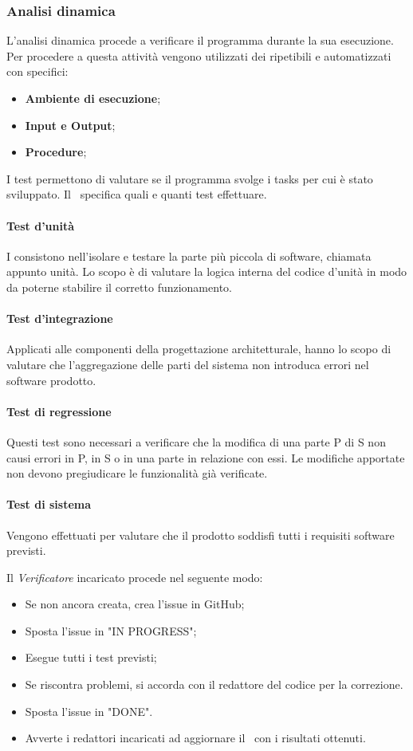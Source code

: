 \subsubsection{Analisi dinamica}
L'analisi dinamica procede a verificare il programma durante la sua esecuzione. Per procedere a questa attività vengono utilizzati dei  ripetibili e automatizzati con specifici:
\begin{itemize}
	\item \textbf{Ambiente di esecuzione};
	\item \textbf{Input e Output};
	\item \textbf{Procedure};
\end{itemize}

\label{Tests}
I test permettono di valutare se il programma svolge i tasks per cui è stato sviluppato. Il \PdQv{}\ specifica quali e quanti test effettuare.
\paragraph*{Test d'unità}
I  consistono nell'isolare e testare la parte più piccola di software, chiamata appunto unità. Lo scopo è di valutare la logica interna del codice d'unità in modo da poterne stabilire il corretto funzionamento. 
\paragraph*{Test d'integrazione}
Applicati alle componenti della progettazione architetturale, hanno lo scopo di valutare che l'aggregazione delle parti del sistema non introduca errori nel software prodotto.
\paragraph*{Test di regressione}
Questi test sono necessari a verificare che la modifica di una parte P di S non causi errori in P, in S o in una parte in relazione con essi. Le modifiche apportate non devono pregiudicare le funzionalità già verificate. 
\paragraph*{Test di sistema}
Vengono effettuati per valutare che il prodotto soddisfi tutti i requisiti software previsti.

\label{ProceduraVerifica}
Il \textit{Verificatore} incaricato procede nel seguente modo:
\begin{itemize}
	\item Se non ancora creata, crea l'issue in GitHub;
	\item Sposta l'issue in "IN PROGRESS";
	\item Esegue tutti i test previsti;
	\item Se riscontra problemi, si accorda con il redattore del codice per la correzione. 
	\item Sposta l'issue in "DONE".
	\item Avverte i redattori incaricati ad aggiornare il \PdQv\ con i risultati ottenuti.
\end{itemize}